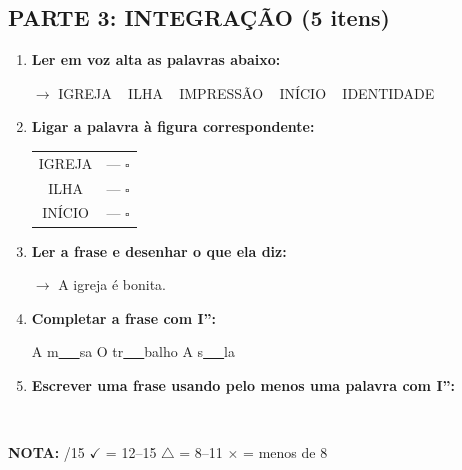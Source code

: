 \begin{exercicio}
\subsection*{PARTE 3: INTEGRAÇÃO (5 itens)}

\begin{enumerate}[resume]
  \item \textbf{Ler em voz alta as palavras abaixo:}
  \begin{center}
  $\rightarrow$ IGREJA  ~  ILHA  ~  IMPRESSÃO  ~  INÍCIO  ~  IDENTIDADE
  \end{center}

  \item \textbf{Ligar a palavra à figura correspondente:}
  \begin{center}
  \begin{tabular}{cc}
  IGREJA & \quad --- \quad $\square$ \\
  ILHA & \quad --- \quad $\square$ \\
  INÍCIO & \quad --- \quad $\square$
  \end{tabular}
  \end{center}

  \item \textbf{Ler a frase e desenhar o que ela diz:}
  \begin{center}
  $\rightarrow$ A igreja é bonita.
  \end{center}
  \begin{center}
  \end{center}

  \item \textbf{Completar a frase com I'':}
  \begin{center}
  A m\underline{~~~}sa \quad O tr\underline{~~~}balho \quad A s\underline{~~~}la
  \end{center}

  \item \textbf{Escrever uma frase usando pelo menos uma palavra com I'':}
  \begin{center}
  \underline{\hspace{12cm}} \\
  \underline{\hspace{12cm}}
  \end{center}
\end{enumerate}

\noindent\textbf{NOTA:} \underline{\hspace{1cm}}/15 \quad $\checkmark$ = 12--15 \quad $\triangle$ = 8--11 \quad $\times$ = menos de 8
\end{exercicio}

